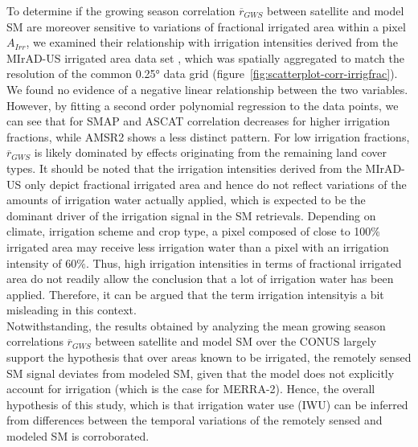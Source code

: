 \documentclass[hess, manuscript]{copernicus}
\begin{document}
To determine if the growing season correlation $\overline{r}_{GWS}$ between satellite and model SM are moreover sensitive to variations of fractional irrigated area within a pixel $A_{Irr}$, we examined their relationship with irrigation intensities derived from the MIrAD-US irrigated area data set \citep{Pervez_2010}, which was spatially aggregated to match the resolution of the common 0.25\si{\degree} data grid (figure~\ref{fig:scatterplot-corr-irrigfrac}). We found no evidence of a negative linear relationship between the two variables. However, by fitting a second order polynomial regression to the data points, we can see that for SMAP and ASCAT correlation decreases for higher irrigation fractions, while AMSR2 shows a less distinct pattern. For low irrigation fractions, $\overline{r}_{GWS}$ is likely dominated by effects originating from the remaining land cover types. It should be noted that the irrigation intensities derived from the MIrAD-US only depict fractional irrigated area and hence do not reflect variations of the amounts of irrigation water actually applied, which is expected to be the dominant driver of the irrigation signal in the SM retrievals. Depending on climate, irrigation scheme and crop type, a pixel composed of close to 100\% irrigated area may receive less irrigation water than a pixel with an irrigation intensity of $60\%$. Thus, high irrigation intensities in terms of fractional irrigated area do not readily allow the conclusion that a lot of irrigation water has been applied. Therefore, it can be argued that the term \glqq irrigation intensity\grqq is a bit misleading in this context.\\

Notwithstanding, the results obtained by analyzing the mean growing season correlations $\overline{r}_{GWS}$ between satellite and model SM over the CONUS largely support the hypothesis that over areas known to be irrigated, the remotely sensed SM signal deviates from modeled SM, given that the model does not explicitly account for irrigation (which is the case for MERRA-2). Hence, the overall hypothesis of this study, which is that irrigation water use (IWU) can be inferred from differences between the temporal variations of the remotely sensed and modeled SM is corroborated. 

\end{document}
